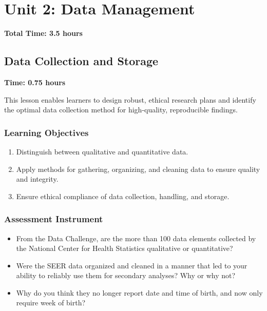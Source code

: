 \chapter{Unit 2: Data Management}
\label{chap:unit2}

\textbf{Total Time: 3.5 hours}


\section{Data Collection and Storage}
\label{sec:2.1}

\textbf{Time: 0.75 hours}

This lesson enables learners to design robust, ethical research plans and identify the optimal data collection method for high-quality, reproducible findings.

\subsection{Learning Objectives}

\begin{enumerate}
    \item Distinguish between qualitative and quantitative data.
    \item Apply methods for gathering, organizing, and cleaning data to ensure quality and integrity.
    \item Ensure ethical compliance of data collection, handling, and storage.
\end{enumerate}

\subsection{Assessment Instrument}

\begin{itemize}
    \item From the Data Challenge, are the more than 100 data elements collected by the National Center for Health Statistics qualitative or quantitative?
    \item Were the SEER data organized and cleaned in a manner that led to your ability to reliably use them for secondary analyses? Why or why not?
    \item Why do you think they no longer report date and time of birth, and now only require week of birth?
\end{itemize}



